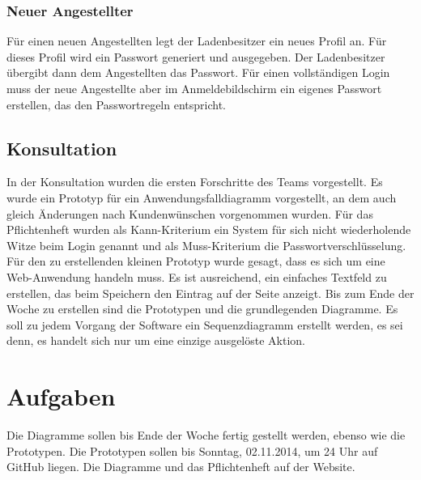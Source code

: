 \documentclass{scrartcl}
\begin{document}
\subsubsection{Neuer Angestellter}
Für einen neuen Angestellten legt der Ladenbesitzer ein neues Profil an. Für dieses Profil wird ein Passwort generiert und ausgegeben. Der Ladenbesitzer übergibt dann dem Angestellten das Passwort. Für einen vollständigen Login muss der neue Angestellte aber im Anmeldebildschirm ein eigenes Passwort erstellen, das den Passwortregeln entspricht.
\subsection{Konsultation}
In der Konsultation wurden die ersten Forschritte des Teams vorgestellt. Es wurde ein Prototyp für ein Anwendungsfalldiagramm
vorgestellt, an dem auch gleich Änderungen nach Kundenwünschen vorgenommen wurden. 
Für das Pflichtenheft wurden 
als Kann-Kriterium ein System für sich nicht wiederholende Witze beim Login genannt und als Muss-Kriterium die
Passwortverschlüsselung. 
Für den zu erstellenden kleinen Prototyp wurde gesagt, dass es sich um eine Web-Anwendung
handeln muss. Es ist ausreichend, ein einfaches Textfeld zu erstellen, das beim Speichern den Eintrag auf der
Seite anzeigt.
Bis zum Ende der Woche zu erstellen sind die Prototypen und die grundlegenden Diagramme. Es soll zu jedem Vorgang
der Software ein Sequenzdiagramm erstellt werden, es sei denn, es handelt sich nur um eine einzige ausgelöste Aktion.

\vspace*{1em}
\section{Aufgaben}
Die Diagramme sollen bis Ende der Woche fertig gestellt werden, ebenso wie die Prototypen. Die Prototypen sollen bis Sonntag, 02.11.2014, um 24 Uhr auf GitHub liegen. Die Diagramme und das Pflichtenheft auf der Website.
\end{document}
